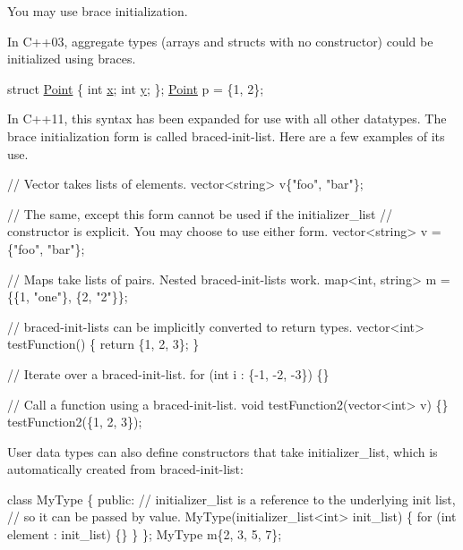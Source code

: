 You may use brace initialization.

In C++03, aggregate types (arrays and structs with no constructor) could be initialized using braces.


\begin{DoxyCode}
\textcolor{keyword}{struct }\hyperlink{classVec2}{Point} \{ \textcolor{keywordtype}{int} \hyperlink{classVec2_adf8ee322d4b4bcc04146762c018d731f}{x}; \textcolor{keywordtype}{int} \hyperlink{classVec2_a30543787e62f6d915543cf1dfb04c094}{y}; \};
\hyperlink{classVec2}{Point} p = \{1, 2\};
\end{DoxyCode}


In C++11, this syntax has been expanded for use with all other datatypes. The brace initialization form is called braced-\/init-\/list. Here are a few examples of its use.


\begin{DoxyCode}
\textcolor{comment}{// Vector takes lists of elements.}
vector<string> v\{\textcolor{stringliteral}{"foo"}, \textcolor{stringliteral}{"bar"}\};

\textcolor{comment}{// The same, except this form cannot be used if the initializer\_list}
\textcolor{comment}{// constructor is explicit. You may choose to use either form.}
vector<string> v = \{\textcolor{stringliteral}{"foo"}, \textcolor{stringliteral}{"bar"}\};

\textcolor{comment}{// Maps take lists of pairs. Nested braced-init-lists work.}
map<int, string> m = \{\{1, \textcolor{stringliteral}{"one"}\}, \{2, \textcolor{stringliteral}{"2"}\}\};

\textcolor{comment}{// braced-init-lists can be implicitly converted to return types.}
vector<int> testFunction() \{
  \textcolor{keywordflow}{return} \{1, 2, 3\};
\}

\textcolor{comment}{// Iterate over a braced-init-list.}
\textcolor{keywordflow}{for} (\textcolor{keywordtype}{int} i : \{-1, -2, -3\}) \{\}

\textcolor{comment}{// Call a function using a braced-init-list.}
\textcolor{keywordtype}{void} testFunction2(vector<int> v) \{\}
testFunction2(\{1, 2, 3\});
\end{DoxyCode}


User data types can also define constructors that take initializer\+\_\+list, which is automatically created from braced-\/init-\/list\+:


\begin{DoxyCode}
\textcolor{keyword}{class }MyType
\{
\textcolor{keyword}{public}:
    \textcolor{comment}{// initializer\_list is a reference to the underlying init list,}
    \textcolor{comment}{// so it can be passed by value.}
    MyType(initializer\_list<int> init\_list) \{
      \textcolor{keywordflow}{for} (\textcolor{keywordtype}{int} element : init\_list) \{\}
    \}
\};
MyType m\{2, 3, 5, 7\};
\end{DoxyCode}


